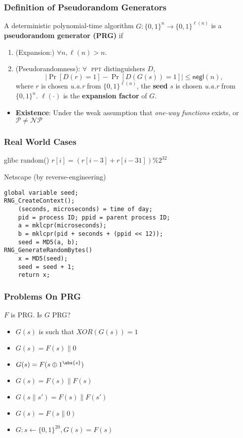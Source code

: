 \begin{frame}\frametitle{Definition of Pseudorandom Generators}
\begin{definition}\label{def:pg}
A deterministic polynomial-time algorithm $G : \{0,1\}^n \to \{0,1\}^{\ell(n)}$ is a \textbf{pseudorandom generator (PRG)} if
\begin{enumerate}
\item (Expansion:) $\forall n, \ell(n) > n$.
\item (Pseudorandomness): $\forall\;$ \textsc{ppt} distinguishers $D$,
\[ \left|\Pr[D(r)=1] - \Pr[D(G(s))=1]\right| \le \mathsf{negl}(n),
\]
where $r$ is chosen \emph{u.a.r} from $\{0,1\}^{\ell(n)}$, the \textbf{seed} $s$ is chosen \emph{u.a.r} from $\{0,1\}^n$. $\ell(\cdot)$ is the \textbf{expansion factor} of $G$.
\end{enumerate}
\end{definition}
\begin{itemize}
\item \textbf{Existence}: Under the weak assumption that \emph{one-way functions} exists, or $\mathcal{P} \ne \mathcal{NP}$
\end{itemize}
\end{frame}
\begin{frame}[fragile]\frametitle{Real World Cases}
\begin{exampleblock}{glibc random()}
$r[i] = (r[i-3] + r[i-31])\%2^{32}$
\end{exampleblock}
\begin{exampleblock}{Netscape (by reverse-engineering)}
\begin{verbatim}
global variable seed; 
RNG_CreateContext();
    (seconds, microseconds) = time of day;
    pid = process ID; ppid = parent process ID;
    a = mklcpr(microseconds);
    b = mklcpr(pid + seconds + (ppid << 12));
    seed = MD5(a, b);
RNG_GenerateRandomBytes()
    x = MD5(seed);
    seed = seed + 1;
    return x;\end{verbatim}
\end{exampleblock}
\end{frame}
\begin{frame}\frametitle{Problems On PRG}
\begin{exampleblock}{$F$ is PRG. Is $G$ PRG?}
\begin{itemize}
\item $G(s)$ is such that $XOR(G(s)) = 1$
\item $G(s)=F(s)\| 0$
\item $G(s)=F(s\oplus 1^{\abs{s}})$
\item $G(s)=F(s)\| F(s)$
\item $G(s\| s')=F(s)\| F(s')$
\item $G(s)=F(s\|0)$
\item $G: s \gets \{0,1\}^{20}, G(s) = F(s)$
\end{itemize}
\end{exampleblock}
\end{frame}
